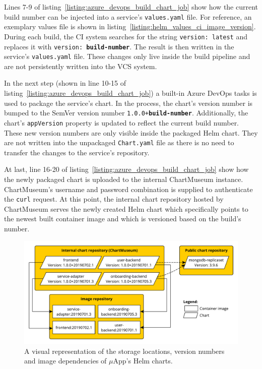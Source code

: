 Lines 7-9 of listing~\ref{listing:azure_devops_build_chart_job} show how the
current build number can be injected into a service's \texttt{values.yaml}
file. For reference, an exemplary values file is shown in
listing~\ref{listing:helm_values_ci_image_version}. During each build, the
\ac{CI} system searches for the string \texttt{version:\textquotedbl
latest\textquotedbl} and replaces it with \texttt{version:\textquotedbl
\textbf{build-number}\textquotedbl}. The result is then written in the
service's \texttt{values.yaml} file. These changes only live inside the build
pipeline and are not persistently written into the \ac{VCS} system.

In the next step (shown in line 10-15 of
listing~\ref{listing:azure_devops_build_chart_job}) a built-in Azure DevOps
tasks is used to package the service's chart. In the process, the chart's
version number is bumped to the SemVer version number
\texttt{1.0.0+\textbf{build-number}}. Additionally, the chart's
\texttt{appVersion} property is updated to reflect the current build number.
These new version numbers are only visible inside the packaged Helm chart. They
are not written into the unpackaged \texttt{Chart.yaml} file as there is no
need to transfer the changes to the service's repository.

At last, line 16-20 of listing~\ref{listing:azure_devops_build_chart_job} show
how the newly packaged chart is uploaded to the internal ChartMuseum instance.
ChartMuseum's username and password combination is supplied to authenticate the
\texttt{curl} request. At this point, the internal chart repository hosted by
ChartMuseum serves the newly created Helm chart which specifically points to
the newest built container image and which is versioned based on the build's
number.

\begin{figure}[H]
\begin{center}
  \includegraphics[scale=0.6]{images/figures/chart_to_image_mapping.pdf}
\end{center}
\caption{A visual representation of the storage locations, version numbers and
image dependencies of $\mu$App's Helm charts.}%
\label{fig:chart_to_image_mapping}
\end{figure}

